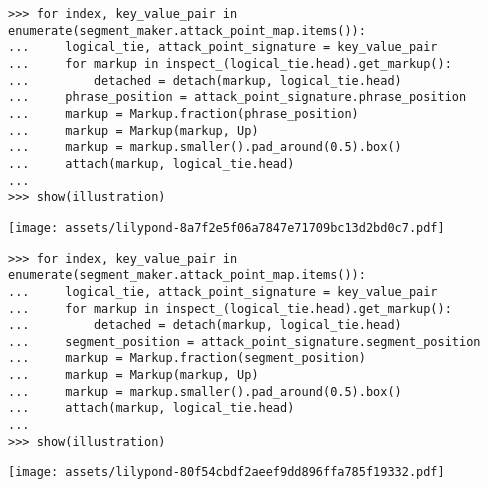 \begin{abjadbookoutput}
\begin{singlespacing}
\vspace{-0.5\baselineskip}
\begin{lstlisting}
>>> for index, key_value_pair in enumerate(segment_maker.attack_point_map.items()):
...     logical_tie, attack_point_signature = key_value_pair
...     for markup in inspect_(logical_tie.head).get_markup():
...         detached = detach(markup, logical_tie.head)
...     phrase_position = attack_point_signature.phrase_position
...     markup = Markup.fraction(phrase_position)
...     markup = Markup(markup, Up)
...     markup = markup.smaller().pad_around(0.5).box()
...     attach(markup, logical_tie.head)
...
>>> show(illustration)
\end{lstlisting}
\noindent\texttt{[image: assets/lilypond-8a7f2e5f06a7847e71709bc13d2bd0c7.pdf]}
\end{singlespacing}
\end{abjadbookoutput}

\begin{comment}
<abjad>[stylesheet=../consort.ily]
for index, key_value_pair in enumerate(segment_maker.attack_point_map.items()):
    logical_tie, attack_point_signature = key_value_pair
    for markup in inspect_(logical_tie.head).get_markup():
        detached = detach(markup, logical_tie.head)
    segment_position = attack_point_signature.segment_position
    markup = Markup.fraction(segment_position)
    markup = Markup(markup, Up)
    markup = markup.smaller().pad_around(0.5).box()
    attach(markup, logical_tie.head)

show(illustration)
</abjad>
\end{comment}

\begin{abjadbookoutput}
\begin{singlespacing}
\vspace{-0.5\baselineskip}
\begin{lstlisting}
>>> for index, key_value_pair in enumerate(segment_maker.attack_point_map.items()):
...     logical_tie, attack_point_signature = key_value_pair
...     for markup in inspect_(logical_tie.head).get_markup():
...         detached = detach(markup, logical_tie.head)
...     segment_position = attack_point_signature.segment_position
...     markup = Markup.fraction(segment_position)
...     markup = Markup(markup, Up)
...     markup = markup.smaller().pad_around(0.5).box()
...     attach(markup, logical_tie.head)
...
>>> show(illustration)
\end{lstlisting}
\noindent\texttt{[image: assets/lilypond-80f54cbdf2aeef9dd896ffa785f19332.pdf]}
\end{singlespacing}
\end{abjadbookoutput}


